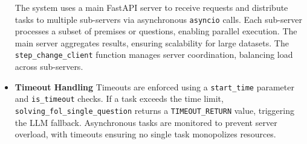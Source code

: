 \documentclass[11pt]{article}
\begin{document}
\begin{itemize}
The system uses a main FastAPI server to receive requests and distribute tasks to multiple sub-servers via asynchronous \texttt{asyncio} calls. Each sub-server processes a subset of premises or questions, enabling parallel execution. The main server aggregates results, ensuring scalability for large datasets. The \texttt{step\_change\_client} function manages server coordination, balancing load across sub-servers.
\item 
\textbf{Timeout Handling}
Timeouts are enforced using a \texttt{start\_time} parameter and \texttt{is\_timeout} checks. If a task exceeds the time limit, \texttt{solving\_fol\_single\_question} returns a \texttt{TIMEOUT\_RETURN} value, triggering the LLM fallback. Asynchronous tasks are monitored to prevent server overload, with timeouts ensuring no single task monopolizes resources.
\end{itemize}
\end{document}
